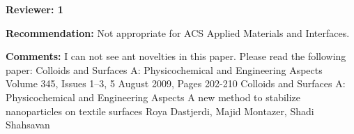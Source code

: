 \documentclass[12pt]{letter}
\newcommand{\blue}[1]{\textcolor{blue}{#1}} %
\begin{document}














\newpage

\textbf{Reviewer: 1}

\textbf{Recommendation:} Not appropriate for ACS Applied Materials and Interfaces.

\textbf{Comments:}
I can not see ant novelties in this paper.
Please read the following paper:
Colloids and Surfaces A: Physicochemical and Engineering 
Aspects
Volume 345, Issues 1–3, 5 August 2009, Pages 202-210
Colloids and Surfaces A: Physicochemical and Engineering 
Aspects
A new method to stabilize nanoparticles on textile surfaces
Roya Dastjerdi, Majid Montazer, Shadi Shahsavan
\end{document}
